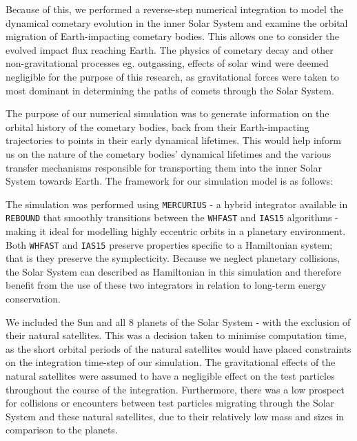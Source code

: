 Because of this, we performed a reverse-step numerical integration to model the dynamical cometary evolution in the inner Solar System and examine the orbital migration of Earth-impacting cometary bodies. This allows one to consider the evolved impact flux reaching Earth. The physics of cometary decay and other non-gravitational processes eg. outgassing, effects of solar wind were deemed negligible for the purpose of this research, as gravitational forces were taken to most dominant in determining the paths of comets through the Solar System.

The purpose of our numerical simulation was to generate information on the orbital history of the cometary bodies, back from their Earth-impacting trajectories to points in their early dynamical lifetimes. This would help inform us on the nature of the cometary bodies' dynamical lifetimes and the various transfer mechanisms responsible for transporting them into the inner Solar System towards Earth. The framework for our simulation model is as follows:

The simulation was performed using \texttt{MERCURIUS} - a hybrid integrator available in \texttt{REBOUND} that smoothly transitions between the \texttt{WHFAST} \citep{2015MNRAS.452..376R} and \texttt{IAS15} \citep{2015MNRAS.446.1424R} algorithms - making it ideal for modelling highly eccentric orbits in a planetary environment. Both \texttt{WHFAST} and \texttt{IAS15} preserve properties specific to a Hamiltonian system; that is they preserve the symplecticity. Because we neglect planetary collisions, the Solar System can described as Hamiltonian in this simulation and therefore benefit from the use of these two integrators in relation to long-term energy conservation.

We included the Sun and all 8 planets of the Solar System - with the exclusion of their natural satellites. This was a decision taken to minimise computation time, as the short orbital periods of the natural satellites would have placed constraints on the integration time-step of our simulation. The gravitational effects of the natural satellites were assumed to have a negligible effect on the test particles throughout the course of the integration. Furthermore, there was a low prospect for collisions or encounters between test particles migrating through the Solar System and these natural satellites, due to their relatively low mass and sizes in comparison to the planets.


